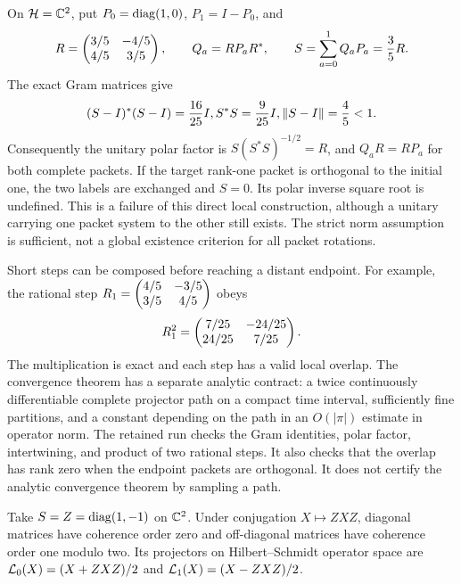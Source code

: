 On $\HH=\CC^2$, put $P_0=\operatorname{diag}(1,0)$, $P_1=I-P_0$, and
\[
R=\begin{pmatrix}3/5&-4/5\\4/5&3/5\end{pmatrix},\qquad Q_a=RP_aR^*,
\qquad S=\sum_{a=0}^1Q_aP_a=\frac35R.
\]
The exact Gram matrices give
\[
(S-I)^*(S-I)=\frac{16}{25}I, S^*S=\frac9{25}I,
\left\lVert S-I\right\rVert=\frac45<1.
\]
Consequently the unitary polar factor is $S(S^*S)^{-1/2}=R$, and $Q_aR=RP_a$ for both complete packets.
If the target rank-one packet is orthogonal to the initial one, the two labels are exchanged and $S=0$. Its polar inverse square root is undefined. This is a failure of this direct local construction, although a unitary carrying one packet system to the other still exists. The strict norm assumption is sufficient, not a global existence criterion for all packet rotations.

Short steps can be composed before reaching a distant endpoint. For example, the rational step $R_1=\begin{pmatrix}4/5&-3/5\\3/5&4/5\end{pmatrix}$ obeys
\[
R_1^2=\begin{pmatrix}7/25&-24/25\\24/25&7/25\end{pmatrix}.
\]
The multiplication is exact and each step has a valid local overlap. The convergence theorem has a separate analytic contract: a twice continuously differentiable complete projector path on a compact time interval, sufficiently fine partitions, and a constant depending on the path in an $O(|\pi|)$ estimate in operator norm.
The retained run checks the Gram identities, polar factor, intertwining, and product of two rational steps. It also checks that the overlap has rank zero when the endpoint packets are orthogonal. It does not certify the analytic convergence theorem by sampling a path.

Take $S=Z=\operatorname{diag}(1,-1)$ on $\CC^2$. Under conjugation $X\mapsto ZXZ$, diagonal matrices have coherence order zero and off-diagonal matrices have coherence order one modulo two. Its projectors on Hilbert--Schmidt operator space are $\Lcal_0(X)=(X+ZXZ)/2$ and $\Lcal_1(X)=(X-ZXZ)/2$.

